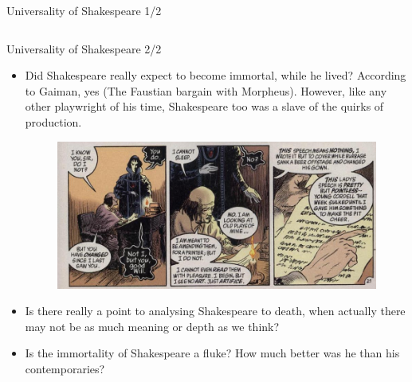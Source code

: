 \documentclass{beamer}
\begin{document}
\begin{frame}{Universality of Shakespeare 1/2}
\begin{columns}[c]
    \end{columns}
  \end{frame}

  \begin{frame}{Universality of Shakespeare 2/2}
    \begin{itemize}
      \item Did Shakespeare really expect to become immortal, while he lived? According to Gaiman, yes (The Faustian bargain with Morpheus). However, like any other playwright of his time, Shakespeare too was a slave of the quirks of production. 
      \begin{figure}[htp]
        \begin{center}
          \centering
          \includegraphics[scale=0.32]{routine.jpg}
        \end{center}
      \end{figure}

    \item Is there really a point to analysing Shakespeare to death, when actually there may not be as much meaning or depth as we think?
      
    \item Is the immortality of Shakespeare a fluke? How much better was he than his contemporaries?
    \end{itemize}
  \end{frame}
\end{document}
